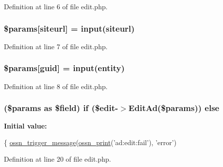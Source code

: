 Definition at line 6 of file edit.\+php.

\subsubsection[{\texorpdfstring{\$params}{$params}}]{\setlength{\rightskip}{0pt plus 5cm}\$params\mbox{[}\textquotesingle{}siteurl\textquotesingle{}\mbox{]} = {\bf input}(\textquotesingle{}siteurl\textquotesingle{})}\hypertarget{components_2_ossn_ads_2actions_2edit_8php_ad013faa5eae30b9aa01b44779a88194b}{}\label{components_2_ossn_ads_2actions_2edit_8php_ad013faa5eae30b9aa01b44779a88194b}


Definition at line 7 of file edit.\+php.

\subsubsection[{\texorpdfstring{\$params}{$params}}]{\setlength{\rightskip}{0pt plus 5cm}\$params\mbox{[}\textquotesingle{}guid\textquotesingle{}\mbox{]} = {\bf input}(\textquotesingle{}entity\textquotesingle{})}\hypertarget{components_2_ossn_ads_2actions_2edit_8php_a8d9f6c370a6f2bc546ef545db5edd2d6}{}\label{components_2_ossn_ads_2actions_2edit_8php_a8d9f6c370a6f2bc546ef545db5edd2d6}


Definition at line 8 of file edit.\+php.

\subsubsection[{\texorpdfstring{else}{else}}]{ (\$params as \$field) {\bf if} (\$edit-\/$>$Edit\+Ad(\$params)) else}\hypertarget{components_2_ossn_ads_2actions_2edit_8php_ae18c4b91036ab84eeb80c21d3f3455f0}{}\label{components_2_ossn_ads_2actions_2edit_8php_ae18c4b91036ab84eeb80c21d3f3455f0}
{\bfseries Initial value\+:}
\begin{DoxyCode}
\{
    \hyperlink{ossn_8lib_8system_8php_ab3f23f23f32f50c12e7aea0ffaccaac7}{ossn\_trigger\_message}(\hyperlink{ossn_8lib_8languages_8php_a2be5d1c4b695593a9b9067b96df2150a}{ossn\_print}(\textcolor{stringliteral}{'ad:edit:fail'}), \textcolor{stringliteral}{'error'})
\end{DoxyCode}


Definition at line 20 of file edit.\+php.

